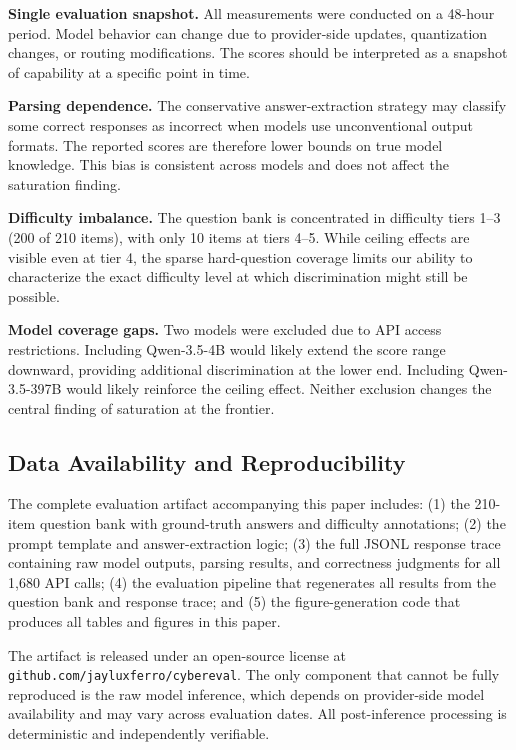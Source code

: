\documentclass[journal]{IEEEtran}
\begin{document}
\textbf{Single evaluation snapshot.} All measurements were conducted on a 48-hour period. Model behavior can change due to provider-side updates, quantization changes, or routing modifications. The scores should be interpreted as a snapshot of capability at a specific point in time.

\textbf{Parsing dependence.} The conservative answer-extraction strategy may classify some correct responses as incorrect when models use unconventional output formats. The reported scores are therefore lower bounds on true model knowledge. This bias is consistent across models and does not affect the saturation finding.

\textbf{Difficulty imbalance.} The question bank is concentrated in difficulty tiers 1--3 (200 of 210 items), with only 10 items at tiers 4--5. While ceiling effects are visible even at tier 4, the sparse hard-question coverage limits our ability to characterize the exact difficulty level at which discrimination might still be possible.

\textbf{Model coverage gaps.} Two models were excluded due to API access restrictions. Including Qwen-3.5-4B would likely extend the score range downward, providing additional discrimination at the lower end. Including Qwen-3.5-397B would likely reinforce the ceiling effect. Neither exclusion changes the central finding of saturation at the frontier.


\subsection{Data Availability and Reproducibility}

The complete evaluation artifact accompanying this paper includes: (1) the 210-item question bank with ground-truth answers and difficulty annotations; (2) the prompt template and answer-extraction logic; (3) the full JSONL response trace containing raw model outputs, parsing results, and correctness judgments for all 1,680 API calls; (4) the evaluation pipeline that regenerates all results from the question bank and response trace; and (5) the figure-generation code that produces all tables and figures in this paper.

The artifact is released under an open-source license at \texttt{github.com/jayluxferro/cybereval}. The only component that cannot be fully reproduced is the raw model inference, which depends on provider-side model availability and may vary across evaluation dates. All post-inference processing is deterministic and independently verifiable.
\end{document}
